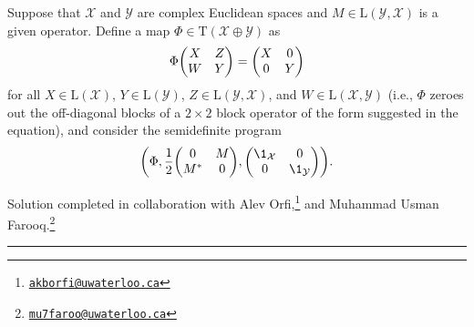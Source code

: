 \documentclass[boxes,pages,color=SeaGreen]{homework}
\newcommand{\collab}[1]{\footnote{\href{mailto:#1}{\texttt{#1}}}}
\newcommand{\X}{\mathcal{X}}
\newcommand{\Y}{\mathcal{Y}}
\newcommand{\Lin}{\mathrm{L}}
\newcommand{\Trans}{\mathrm{T}}
\begin{document}
\def\arraystretch{1.2}


\begin{problem}
Suppose that $\X$ and $\Y$ are complex Euclidean spaces and $M\in\Lin(\Y,\X)$
is a given operator.
Define a map $\Phi\in\Trans(\X\oplus\Y)$ as
\[
    \Phi\mqty(
    X & Z \\
    W & Y
    ) = \mqty(
    X & 0 \\
    0 & Y
    )
\]
for all $X\in\Lin(\X)$, $Y\in\Lin(\Y)$, $Z\in\Lin(\Y,\X)$, and
$W\in\Lin(\X,\Y)$ (i.e., $\Phi$ zeroes out the off-diagonal blocks of a
$2\times 2$ block operator of the form suggested in the equation), and
consider the semidefinite program
\[
    \qty(
    \Phi,
    \frac{1}{2}\mqty(0 & M \\ M^* & 0),
    \mqty(\1_{\X} & 0 \\ 0 & \1_{\Y})
    ).
\]

\end{problem}

\noindent Solution completed in collaboration with Alev Orfi,\collab{akborfi@uwaterloo.ca} and Muhammad Usman Farooq.\collab{mu7faroo@uwaterloo.ca}

{\noindent\color{SeaGreen!30}\rule{\textwidth}{1.5pt}}
\end{document}

